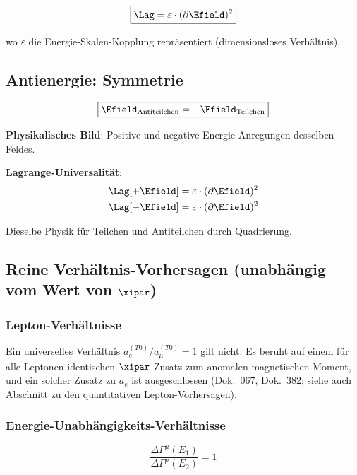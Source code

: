 	\begin{equation}
		\boxed{\Lag = \varepsilon \cdot (\partial \Efield)^2}
		\label{eq:universal_lagrangian}
	\end{equation}
	
	wo $\varepsilon$ die Energie-Skalen-Kopplung repräsentiert (dimensionsloses Verhältnis).
	
	\subsection{Antienergie: Symmetrie}
	
	\begin{equation}
		\boxed{\Efield_{\text{Antiteilchen}} = -\Efield_{\text{Teilchen}}}
		\label{eq:energy_antisymmetry}
	\end{equation}
	
	\textbf{Physikalisches Bild}: Positive und negative Energie-Anregungen desselben Feldes.
	
	\textbf{Lagrange-Universalität}:
	\begin{align}
		\Lag[+\Efield] &= \varepsilon \cdot (\partial \Efield)^2 \\
		\Lag[-\Efield] &= \varepsilon \cdot (\partial \Efield)^2
	\end{align}
	
	Dieselbe Physik für Teilchen und Antiteilchen durch Quadrierung.
	
	\subsection{Reine Verhältnis-Vorhersagen (unabhängig vom Wert von $\xipar$)}
	
	\subsubsection{Lepton-Verhältnisse}
	
	Ein universelles Verhältnis $a_e^{(T0)}/a_{\mu}^{(T0)} = 1$ gilt nicht: Es beruht auf einem für alle Leptonen identischen $\xipar$-Zusatz zum anomalen magnetischen Moment, und ein solcher Zusatz zu $a_e$ ist ausgeschlossen (Dok.~067, Dok.~382; siehe auch Abschnitt zu den quantitativen Lepton-Vorhersagen).
	
	\subsubsection{Energie-Unabhängigkeits-Verhältnisse}
	
	\begin{equation}
		\boxed{\frac{\Delta\Gamma^{\mu}(E_1)}{\Delta\Gamma^{\mu}(E_2)} = 1}
		\label{eq:energy_independence_ratio}
	\end{equation}
	
